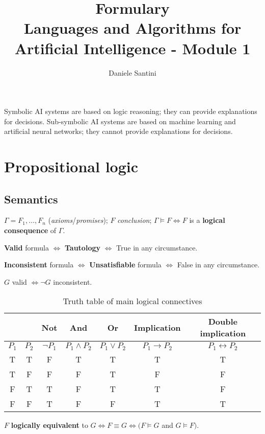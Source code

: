 \documentclass[]{article}
\title{Formulary \\ \large Languages and Algorithms for Artificial Intelligence - Module 1}
\author{Daniele Santini}
\begin{document}

Symbolic AI systems are based on logic reasoning; they can provide explanations for decisions. Sub-symbolic AI systems are based on machine learning and artificial neural networks; they cannot provide explanations for decisions.

\section{Propositional logic}

\subsection{Semantics}

\noindent $\Gamma = F_1,\dots,F_n$ (\textit{axioms}/\textit{promises});
$F$ \textit{conclusion}; 	
$\Gamma \models F \iff F$ is a \textbf{logical consequence} of $\Gamma$.

\noindent \textbf{Valid} formula $\iff$ \textbf{Tautology} $\iff$ True in any circumstance.

\noindent \textbf{Inconsistent} formula $\iff$ \textbf{Unsatisfiable} formula $\iff$ False in any circumstance.

\noindent $G$ valid $\iff \neg G$ inconsistent.

\begin{table}[h]
	\centering
	\caption{Truth table of main logical connectives}
	\begin{tabular}{ |c |c|c | c | c| c | c | } 
		\hline
		 &  & \textbf{Not} & \textbf{And} & \textbf{Or} & \textbf{Implication} & \textbf{Double implication} \\
		\hline
		$P_1$ & $P_2$ & $\neg P_1$ & $P_1 \land P_2$ & $P_1 \lor P_2$ & $P_1 \rightarrow P_2$ & $P_1 \leftrightarrow P_2$ \\
		\hline
		T & T & F & T & T & T & T \\
		\hline
		T & F & F & F & T & F & F \\
		\hline
		F & T & T & F & T & T & F \\
		\hline
		F & F & T & F & F & T & T \\
		\hline
	\end{tabular}
\end{table}

\noindent $F$ \textbf{logically equivalent} to $G \iff F \equiv G \iff (F \models G$ and $G \models F)$.
\end{document}
